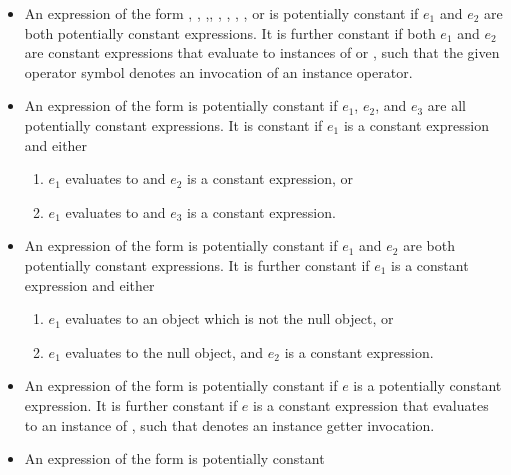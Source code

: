 \documentclass[makeidx]{article}
\begin{document}
{\begin{itemize}
  An expression of the form  is a potentially constant expression
  if $e_1$ is a potentially constant expression.
  It is further a constant expression if $e_1$ is a constant expression that
  evaluates to an instance of type  or ,
  such that \lit{-} denotes an instance operator invocation.
\item
  An expression of the form , ,
  ,, ,
  , , , or
  is potentially constant
  if $e_1$ and $e_2$ are both potentially constant expressions.
  It is further constant if both $e_1$ and $e_2$ are constant expressions that
  evaluate to instances of  or ,
  such that the given operator symbol denotes
  an invocation of an instance operator.
\item
  An expression of the form 
  is potentially constant if $e_1$, $e_2$, and $e_3$
  are all potentially constant expressions.
  It is constant if $e_1$ is a constant expression and either
  \begin{enumerate}
  \item $e_1$ evaluates to \TRUE{} and $e_2$ is a constant expression, or
  \item $e_1$ evaluates to \FALSE{} and $e_3$ is a constant expression.
  \end{enumerate}
\item
  An expression of the form  is potentially constant
  if $e_1$ and $e_2$ are both potentially constant expressions.
  It is further constant if $e_1$ is a constant expression and either
  \begin{enumerate}
  \item $e_1$ evaluates to an object which is not the null object, or
  \item $e_1$ evaluates to the null object, and $e_2$ is a constant expression.
  \end{enumerate}
\item
  An expression of the form  is potentially constant
  if $e$ is a potentially constant expression.
  It is further constant if $e$ is a constant expression that
  evaluates to an instance of ,
  such that  denotes an instance getter invocation.
\item
  An expression of the form  is potentially constant

\end{itemize}}
\end{document}
